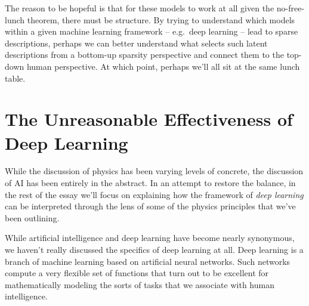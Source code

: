 \documentclass[12pt]{article}
\begin{document}
The reason to be hopeful is that for these models to work at all given the no-free-lunch theorem, there must be structure. 
By trying to understand which models within a given machine learning framework -- e.g.~deep learning -- lead to sparse descriptions, perhaps we can better understand
what selects such latent descriptions from a bottom-up sparsity perspective and connect them to the top-down human perspective. %
At which point, perhaps we'll all sit at the same lunch table. 




















































\section{The Unreasonable Effectiveness of Deep Learning}\label{sec:ETofDL}
While the discussion of physics has been varying levels of concrete, the discussion of AI has been entirely in the abstract. In an attempt to restore the balance, 
in the rest of the essay we'll focus on explaining how the framework of \emph{deep learning} can be interpreted through the lens of some of the physics principles that we've  been outlining.


While artificial intelligence and deep learning have become nearly synonymous, we haven't really discussed the specifics of deep learning at all. Deep learning is a branch of machine learning based on artificial neural networks. Such networks compute a very flexible set of functions that turn out to be excellent for mathematically modeling the sorts of tasks 
that we associate with human intelligence. 
\end{document}

